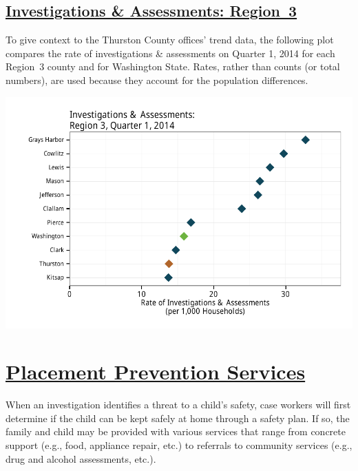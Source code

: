 \documentclass{article}\usepackage[]{graphicx}\usepackage[]{color}
\makeatletter
\def\maxwidth{ %
  \ifdim\Gin@nat@width>\linewidth
    \linewidth
  \else
    \Gin@nat@width
  \fi
}
\newenvironment{knitrout}{}{} %
\makeatother
\begin{document}
\subsection{
    \href{http://www.partnersforourchildren.org//data-portal/visualizations/investigations-assessments/trends}
    {Investigations \& Assessments: Region~3}}
To give context to the Thurston County offices' trend data, the following plot compares the rate of investigations \& assessments on Quarter 1, 2014 for each Region~3 county and for Washington State.  Rates, rather than counts (or total numbers), are used because they account for the population differences.
\nopagebreak[3]
\begin{knitrout}
\color{fgcolor}

{\centering \includegraphics[width=\maxwidth]{figure/ia_context-1} 

}



\end{knitrout}

\newpage
\section{\href{http://www.partnersforourchildren.org/data-portal/visualizations/home-services/trends}
    {Placement Prevention Services}
}
When an investigation identifies a threat to a child's safety, case workers will first determine if the child can be kept safely at home through a safety plan. If so, the family and child may be provided with various services that range from concrete support (e.g., food, appliance repair, etc.) to referrals to community services (e.g., drug and alcohol assessments, etc.).\\[6pt]
\label{p:ihs}
\end{document}
